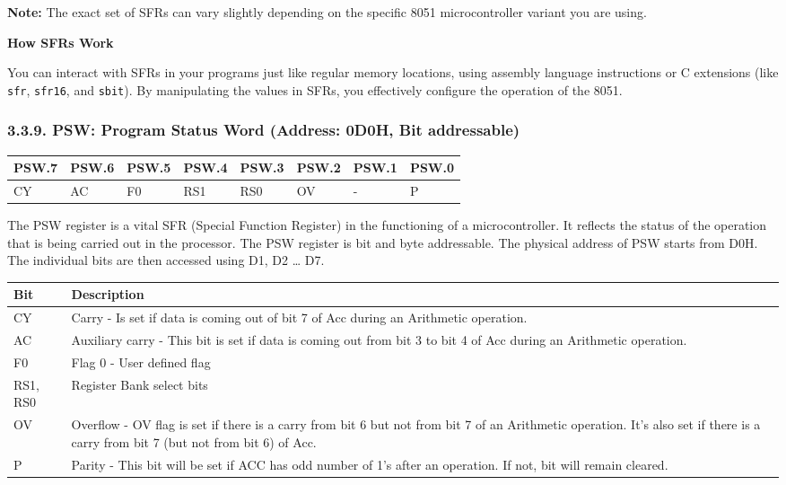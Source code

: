 \documentclass[
]{article}
\begin{document}
\textbf{Note:} The exact set of SFRs can vary slightly depending on the
specific 8051 microcontroller variant you are using.

\textbf{How SFRs Work}

You can interact with SFRs in your programs just like regular memory
locations, using assembly language instructions or C extensions (like
\texttt{sfr}, \texttt{sfr16}, and \texttt{sbit}). By manipulating the
values in SFRs, you effectively configure the operation of the 8051.

\hypertarget{339-psw-program-status-word-address-0d0h-bit-addressable}{%
\subsubsection{3.3.9. PSW: Program Status Word (Address: 0D0H, Bit
addressable)}\label{339-psw-program-status-word-address-0d0h-bit-addressable}}

\begin{longtable}[]{@{}llllllll@{}}
\toprule
PSW.7 & PSW.6 & PSW.5 & PSW.4 & PSW.3 & PSW.2 & PSW.1 & PSW.0 \\
\midrule
\endhead
CY & AC & F0 & RS1 & RS0 & OV & - & P \\
\bottomrule
\end{longtable}

The PSW register is a vital SFR (Special Function Register) in the
functioning of a microcontroller. It reflects the status of the
operation that is being carried out in the processor. The PSW register
is bit and byte addressable. The physical address of PSW starts from
D0H. The individual bits are then accessed using D1, D2 \ldots{} D7.

\begin{longtable}[]{@{}ll@{}}
\toprule
Bit & Description \\
\midrule
\endhead
CY & Carry - Is set if data is coming out of bit 7 of Acc during an
Arithmetic operation. \\
AC & Auxiliary carry - This bit is set if data is coming out from bit 3
to bit 4 of Acc during an Arithmetic operation. \\
F0 & Flag 0 - User defined flag \\
RS1, RS0 & Register Bank select bits \\
OV & Overflow - OV flag is set if there is a carry from bit 6 but not
from bit 7 of an Arithmetic operation. It's also set if there is a carry
from bit 7 (but not from bit 6) of Acc. \\
P & Parity - This bit will be set if ACC has odd number of 1's after an
operation. If not, bit will remain cleared. \\
\bottomrule
\end{longtable}
\end{document}
